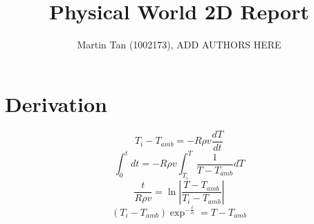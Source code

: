\documentclass[12pt,a4paper]{IEEEtran}
\author{Martin Tan (1002173), ADD AUTHORS HERE}
\title{Physical World 2D Report}
\begin{document}
	\maketitle
	\section{Derivation}
	$$T_i - T_{amb} = -R \rho v \frac{dT}{dt}$$
	$$\int_{0}^{t} dt = -R \rho v \int_{T_i}^{T}\frac{1}{T-T_{amb}} dT$$
	$$\frac{t}{R \rho v} = \ln \left| \frac{T - T_{amb}}{T_i - T_{amb}} \right|$$
	$$\left( T_i - T_{amb} \right) \exp^{-\frac{t}{\alpha}} = T - T_{amb}$$
\end{document}
